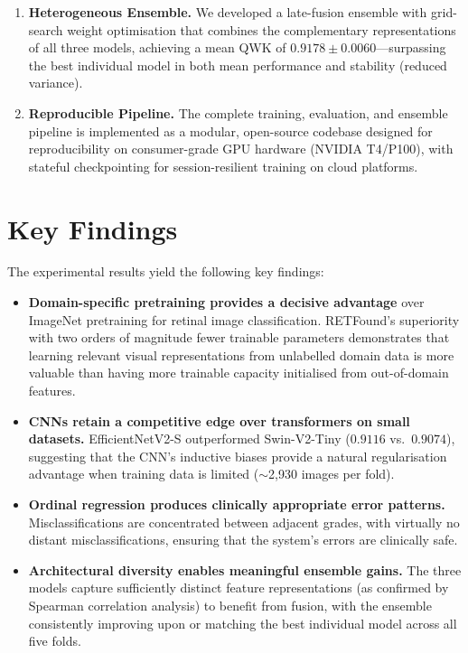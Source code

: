 \begin{enumerate}
    \item \textbf{Heterogeneous Ensemble.} We developed a late-fusion ensemble with grid-search weight optimisation that combines the complementary representations of all three models, achieving a mean QWK of $0.9178 \pm 0.0060$---surpassing the best individual model in both mean performance and stability (reduced variance).
    
    \item \textbf{Reproducible Pipeline.} The complete training, evaluation, and ensemble pipeline is implemented as a modular, open-source codebase designed for reproducibility on consumer-grade GPU hardware (NVIDIA T4/P100), with stateful checkpointing for session-resilient training on cloud platforms.
\end{enumerate}

\section{Key Findings}
\label{sec:key_findings}

The experimental results yield the following key findings:

\begin{itemize}
    \item \textbf{Domain-specific pretraining provides a decisive advantage} over ImageNet pretraining for retinal image classification. RETFound's superiority with two orders of magnitude fewer trainable parameters demonstrates that learning relevant visual representations from unlabelled domain data is more valuable than having more trainable capacity initialised from out-of-domain features.
    
    \item \textbf{CNNs retain a competitive edge over transformers on small datasets.} EfficientNetV2-S outperformed Swin-V2-Tiny ($0.9116$ vs.\ $0.9074$), suggesting that the CNN's inductive biases provide a natural regularisation advantage when training data is limited ($\sim$2,930 images per fold).
    
    \item \textbf{Ordinal regression produces clinically appropriate error patterns.} Misclassifications are concentrated between adjacent grades, with virtually no distant misclassifications, ensuring that the system's errors are clinically safe.
    
    \item \textbf{Architectural diversity enables meaningful ensemble gains.} The three models capture sufficiently distinct feature representations (as confirmed by Spearman correlation analysis) to benefit from fusion, with the ensemble consistently improving upon or matching the best individual model across all five folds.
\end{itemize}

